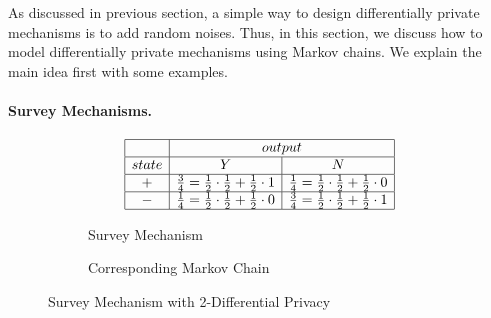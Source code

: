 As discussed in previous section, a simple way to design differentially private mechanisms is to add
random noises.
Thus, in this section, we discuss how to model differentially private mechanisms using Markov chains. We explain the main idea first with some examples.

\paragraph{Survey Mechanisms.}

\begin{figure}
  \centering
  \begin{subfigure}{.48\columnwidth}
      \[
      \begin{array}{|c|c|c|}
        \hline
        &
        \multicolumn{2}{c|}{output}
        \\
        \hline
        state & Y & N \\
        \hline
        + & \frac{3}{4} = \frac{1}{2} \cdot \frac{1}{2} + \frac{1}{2} \cdot 1
          & \frac{1}{4} = \frac{1}{2} \cdot \frac{1}{2} + \frac{1}{2} \cdot 0
        \\
        \hline
        - & \frac{1}{4} = \frac{1}{2} \cdot \frac{1}{2} + \frac{1}{2} \cdot 0
          & \frac{3}{4} = \frac{1}{2} \cdot \frac{1}{2} + \frac{1}{2} \cdot 1
        \\
        \hline
      \end{array}
      \]
    \caption{Survey Mechanism}
    \label{figure:2-dp-table}
  \end{subfigure}
  \hspace{.05\columnwidth}
  \begin{subfigure}{.40\columnwidth}
    \caption{Corresponding Markov Chain}
    \label{figure:2-dp-mdp}
  \end{subfigure}
  \caption{Survey Mechanism with 2-Differential Privacy}
  \label{figure:2-dp}
\end{figure}

